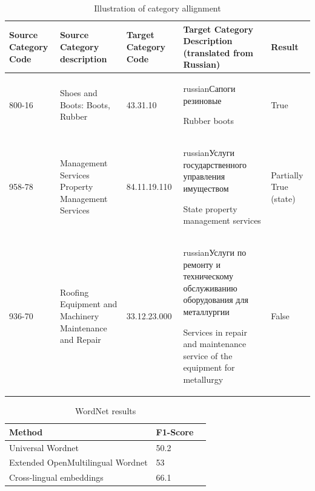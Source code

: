 \documentclass[11pt,a4paper]{article}
\begin{document}
\begin{center}
       \begin{table}
		\label{table-annotation}
		\small
		\centering
		\caption{Illustration of category allignment}
		\begin{tabular}{|p{2cm}|p{4cm}|p{2cm}|p{4cm}|p{1cm}|}
			\hline
			{Source Category Code} & {Source Category description}& {Target Category Code} & {Target Category Description (translated from Russian)} & {Result}\\
			\hline
			{800-16} & {Shoes and Boots: Boots, Rubber} &
			{43.31.10} & {\begin{otherlanguage*}{russian}Сапоги резиновые\end{otherlanguage*} \newline Rubber boots} &
			{True}
			\\
			\hline
			958-78 & Management Services Property Management Services &
			{84.11.19.110} & \begin{otherlanguage*}{russian}Услуги государственного управления имуществом\end{otherlanguage*} \newline State property management services &
			Partially True (state)
			\\
			\hline
			936-70 & {Roofing Equipment and Machinery Maintenance and Repair} &
			{33.12.23.000} & \begin{otherlanguage*}{russian}Услуги по ремонту и техническому обслуживанию оборудования для металлургии
			\end{otherlanguage*} \newline Services in repair and maintenance service of the equipment for metallurgy &
			False
			\\
			\hline


		\end{tabular}
	\end{table}
\end{center}

\begin{table}[ht]
	\small
	\caption{WordNet results}
	\label{table-wordnet-results}
	\begin{tabular}{|l|l|l|}

		\hline
		{Method} & {F1-Score} \\ \hline
		Universal Wordnet & 50.2 \\ \hline
		Extended OpenMultilingual Wordnet & 53 \\ \hline
		Cross-lingual embeddings & 66.1 \\
		\hline
	\end{tabular}
\end{table}
\end{document}
